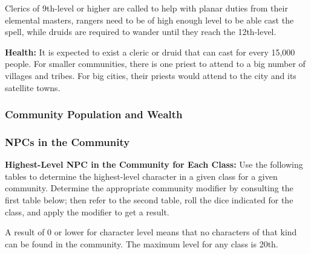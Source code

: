 Clerics of 9th-level or higher are called to help with planar duties from their elemental masters, rangers need to be of high enough level to be able cast the spell, while druids are required to wander until they reach the 12th-level.

\textbf{Health:} It is expected to exist a cleric or druid that can cast  for every 15,000 people. For smaller communities, there is one priest to attend to a big number of villages and tribes. For big cities, their priests would attend to the city and its satellite towns.

\subsubsection{Community Population and Wealth}
\subsubsection{NPCs in the Community}
\textbf{Highest-Level NPC in the Community for Each Class:} Use the following tables to determine the highest-level character in a given class for a given community. Determine the appropriate community modifier by consulting the first table below; then refer to the second table, roll the dice indicated for the class, and apply the modifier to get a result.

A result of 0 or lower for character level means that no characters of that kind can be found in the community. The maximum level for any class is 20th.



